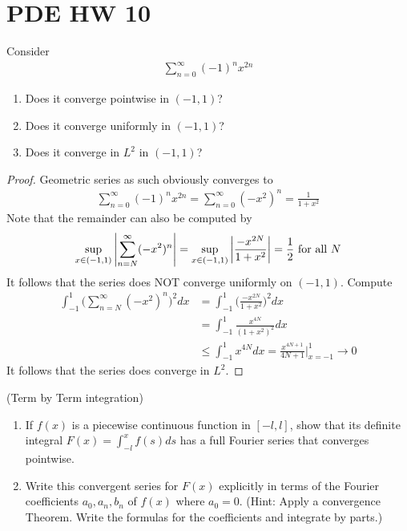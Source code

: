 \documentclass{report}
\begin{document}
\section{PDE HW 10}
\begin{question}{}{}
Consider 
\begin{align*}
\sum_{n=0}^{\infty}(-1)^n x^{2n}
\end{align*}
\begin{enumerate}[label=(\alph*)]
  \item Does it converge pointwise in $(-1,1)$?  
  \item Does it converge uniformly in $(-1,1)$? 
  \item Does it converge in $L^2$ in $(-1,1)$? 
\end{enumerate}
\end{question}
\begin{proof}
Geometric series as such obviously  converges to 
\begin{align*}
\sum_{n=0}^{\infty} (-1)^n x^{2n}= \sum_{n=0}^{\infty}(-x^2)^n= \frac{1}{1+x^2}
\end{align*}
Note that the remainder can also be computed by 
\begin{align*}
  \sup_{x\in (-1,1)}\left|\sum_{n=N}^{\infty} (-x^2)^n\right|= \sup_{x \in (-1,1)}\left|\frac{-x^{2N}}{1+x^2}\right|= \frac{1}{2}\text{ for all }N
\end{align*}
It follows that the series does NOT converge uniformly on $(-1,1)$. Compute 
\begin{align*}
\int_{-1}^{1} \Big(\sum_{n=N}^{\infty} (-x^2)^n \Big)^2 dx&= \int_{-1}^1 \Big( \frac{-x^{2N}}{1+x^2} \Big)^2 dx  \\
&=\int_{-1}^1 \frac{x^{4N}}{(1+x^2)^2}dx \\
&\leq \int_{-1}^{1} x^{4N}dx= \frac{x^{4N+1}}{4N+1}\Big|_{x=-1}^{1}\to 0
\end{align*}
It follows that the series does converge in $L^2$. 
\end{proof}
\begin{question}{}{}
  (Term by Term integration) 
\begin{enumerate}[label=(\alph*)]
  \item If $f(x)$ is a piecewise continuous function in $[-l,l]$, show that its definite integral $F(x)=\int_{-l}^x f(s)ds$ has a full Fourier series that converges pointwise. 
  \item Write this convergent series for $F(x)$ explicitly in terms of the Fourier coefficients $a_0,a_n,b_n$ of  $f(x)$ where $a_0=0$. (Hint: Apply a convergence Theorem. Write the formulas for the coefficients and integrate by parts.)
\end{enumerate}
\end{question}
\end{document}

